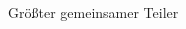 \documentclass[a4paper]{article}
\begin{document}
\begin{multicols}{3}

      Größter gemeinsamer Teiler


\end{multicols}
\end{document}
